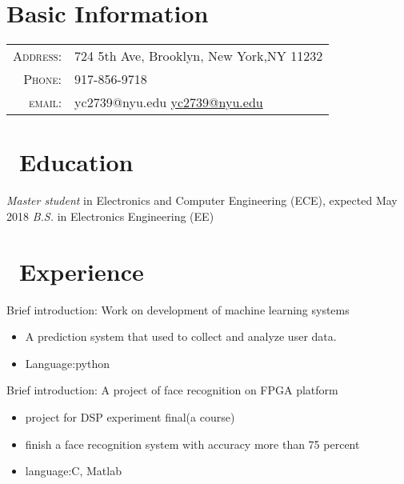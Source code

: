 \documentclass{resume}
\begin{document}


\section{Basic Information}

\begin{tabular}{rl}
    \textsc{Address:}   & 724 5th Ave, Brooklyn, New York,NY 11232 \\
    \textsc{Phone:}     & 917-856-9718\\
    \textsc{email:}     & yc2739@nyu.edu \href{mailto:yc2739@nyu.edu}{yc2739@nyu.edu}
\end{tabular}

\section{\faGraduationCap\ Education}
\textit{Master student} in Electronics and Computer Engineering (ECE), expected May 2018
\textit{B.S.} in Electronics Engineering (EE)

\section{\faUsers\ Experience}
Brief introduction: Work on development of machine learning systems
\begin{itemize}
  \item A prediction system that used to collect and analyze user data.
  \item Language:python
\end{itemize}

Brief introduction: A project of face recognition on FPGA platform
\begin{itemize}
  \item project for DSP experiment final(a course)
  \item finish a face recognition system with accuracy more than 75 percent
  \item language:C, Matlab
\end{itemize}
\end{document}
